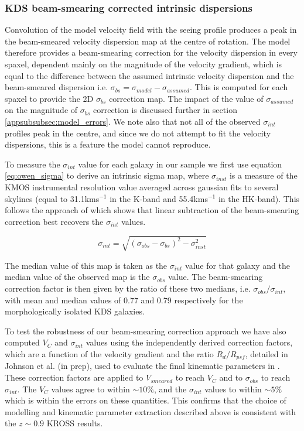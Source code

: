 \documentclass[fleqn,usenatbib]{mn2e}
\begin{document}
\subsubsection{KDS beam-smearing corrected intrinsic dispersions}\label{subsubsec:beam_smearing_corrected_dispersions}
Convolution of the model velocity field with the seeing profile produces a peak in the beam-smeared velocity dispersion map at the centre of rotation.
The model therefore provides a beam-smearing correction for the velocity dispersion in every spaxel, dependent mainly on the magnitude of the velocity gradient, which is equal to the difference between the assumed intrinsic velocity dispersion and the beam-smeared dispersion i.e. $\sigma_{bs} = \sigma_{model} - \sigma_{assumed}$.
This is computed for each spaxel to provide the 2D $\sigma_{bs}$ correction map.
The impact of the value of $\sigma_{assumed}$ on the magnitude of $\sigma_{bs}$ correction is discussed further in section \cref{appsubsubsec:model_errors}.
We note also that not all of the observed $\sigma_{int}$ profiles peak in the centre, and since we do not attempt to fit the velocity dispersions, this is a feature the model cannot reproduce. 

To measure the $\sigma_{int}$ value for each galaxy in our sample we first use equation \ref{eq:owen_sigma} to derive an intrinsic sigma map, where $\sigma_{inst}$ is a measure of the KMOS instrumental resolution value averaged across gaussian fits to several skylines (equal to 31.1kms$^{-1}$ in the K-band and 55.4kms$^{-1}$ in the HK-band).
This follows the approach of \cite{Stott2016} which shows that linear subtraction of the beam-smearing correction best recovers the $\sigma_{int}$ values. 

\begin{equation}\label{eq:owen_sigma}
   \sigma_{int} = \sqrt{\left(\sigma_{obs} - \sigma_{bs} \right)^{2} - \sigma_{inst}^{2}}
\end{equation}

The median value of this map is taken as the $\sigma_{int}$ value for that galaxy and the median value of the observed map is the $\sigma_{obs}$ value.
The beam-smearing correction factor is then given by the ratio of these two medians, i.e. $\sigma_{obs}/\sigma_{int}$, with mean and median values of 0.77 and 0.79 respectively for the morphologically isolated KDS galaxies.


To test the robustness of our beam-smearing correction approach we have also computed $V_{C}$ and $\sigma_{int}$ values using the independently derived correction factors, which are a function of the velocity gradient and the ratio $R_{d}/R_{psf}$, detailed in Johnson et al. (in prep), used to evaluate the final kinematic parameters in \cite{Harrison2017}.
These correction factors are applied to $V_{smeared}$ to reach $V_{C}$ and to $\sigma_{obs}$ to reach $\sigma_{int}$.
The $V_{C}$ values agree to within $\sim10\%$, and the $\sigma_{int}$ values to within $\sim5\%$ which is within the errors on these quantities. 
This confirms that the choice of modelling and kinematic parameter extraction described above is consistent with the $z\sim0.9$ KROSS results.
\end{document}
